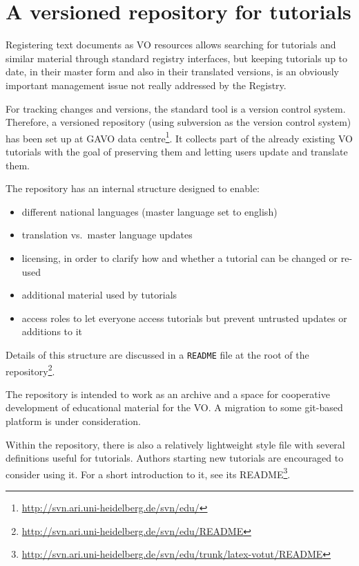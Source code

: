 \documentclass{ivoa}
\begin{document}
\section{A versioned repository for tutorials}

\label{sect:svn-repo}

Registering text documents as VO resources allows searching for tutorials
and similar
material through standard registry interfaces, but keeping
tutorials up to date, in their master form and also in their translated
versions, is an obviously important management issue not really
addressed by the Registry.

For tracking changes and versions, the standard tool is a version
control system.  Therefore,
a versioned repository (using subversion as the version control system)
has been set up at GAVO data
centre\footnote{\url{http://svn.ari.uni-heidelberg.de/svn/edu/}}.
It collects part of the
already existing VO tutorials with the goal of preserving them and
letting users
update and translate them.

The repository has an internal structure designed to enable:

\begin{itemize}

\item different national languages (master language set to english){}

\item translation vs.~master language updates{}

\item licensing, in order to clarify how and whether a tutorial can be changed or re-used{}

\item additional material used by tutorials

\item access roles to let everyone access tutorials but prevent untrusted updates or additions to it

\end{itemize}

Details of this structure are discussed in a \texttt{README} file at the
root of the
repository\footnote{\url{http://svn.ari.uni-heidelberg.de/svn/edu/README}}.

The repository is intended to work as an archive and a space for cooperative
development of educational material for the VO.  A migration to some
git-based platform is under consideration.

Within the repository, there is also a relatively lightweight style file
with several definitions useful for tutorials.  Authors starting new
tutorials are encouraged to consider using it.  For a short introduction
to it, see its README\footnote{\url{http://svn.ari.uni-heidelberg.de/svn/edu/trunk/latex-votut/README}}.
\end{document}
